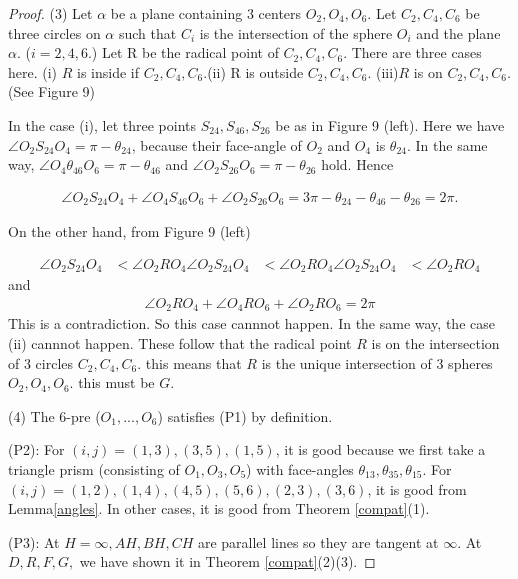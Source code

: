 \documentclass[dvipdfmx]{interact}
\theoremstyle{plain}%
\theoremstyle{definition}
\theoremstyle{remark}
\theoremstyle{problemstyle}
\begin{document}
\begin{proof}
(3) Let $\alpha$ be a plane containing 3 centers $O_2, O_4, O_6$. Let
 $C_2, C_4, C_6$ be three circles on $\alpha$ such that $C_i$ is the
 intersection of the sphere $O_i$ and the plane $\alpha$. ($i=2, 4, 6$.)
Let R be the radical point of $C_2, C_4, C_6$. There are three cases
 here.
(i) $R$ is inside if $C_2, C_4, C_6$.(ii) R is outside $C_2, C_4, C_6$.
(iii)$R$ is on $C_2, C_4, C_6$. (See Figure 9)

In the case (i), let three points $S_{24}, S_{46}, S_{26}$ be as in Figure
 9 (left). Here we have $\angle O_2 S_{24} O_4 = \pi - \theta_{24}$,
because their face-angle of $O_2$ and $O_4$ is $\theta_{24}$.
In the same way, $\angle O_4\theta_{46}O_6 = \pi - \theta_{46}$ and
$\angle O_2S_{26}O_6 = \pi-\theta_{26}$ hold. Hence

\begin{align*}
 \angle O_2 S_{24} O_4 + \angle O_4 S_{46} O_6 + \angle O_2 S_{26} O_6 = 3\pi -
 \theta_{24} - \theta_{46} - \theta_{26} = 2\pi.
\end{align*}

On the other hand, from Figure 9 (left)

\begin{align*}
 \angle O_2 S_{24} O_4 &< \angle O_2 R O_4
 \angle O_2 S_{24} O_4 &< \angle O_2 R O_4
 \angle O_2 S_{24} O_4 &< \angle O_2 R O_4
\end{align*}
and
\begin{align*}
 \angle O_2 R O_4 + \angle O_4 R O_6 + \angle O_2 R O_6 = 2\pi
\end{align*}
This is a contradiction. So this case cannnot happen. In the same way,
 the case (ii) cannnot happen. These follow that the radical point $R$
 is on the intersection of 3 circles $C_2, C_4, C_6.$ this means that
 $R$ is the unique intersection of 3 spheres $O_2, O_4, O_6$. this must
 be $G$.

(4) The 6-pre ($O_1, ..., O_6$) satisfies (P1) by definition.

(P2): For $(i, j) = (1, 3), (3, 5), (1, 5)$, it is good because we first
 take a triangle prism (consisting of $O_1, O_3, O_5$) with face-angles
 $\theta_{13}, \theta_{35}, \theta_{15}.$ 
For $(i, j) = (1, 2), (1, 4), (4, 5), (5, 6), (2, 3), (3, 6)$, it is
 good from Lemma\ref{angles}. In other cases, it is good from Theorem
 \ref{compat}(1).

(P3): At $H = \infty, AH, BH, CH$ are parallel lines so they are tangent
 at $\infty$. At $D, R, F, G,$ we have shown it in Theorem \ref{compat}(2)(3).
\end{proof}
\end{document}
